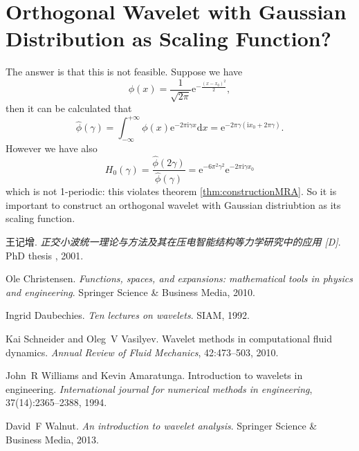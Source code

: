 \documentclass{book}
\newcommand{\mathd}{\mathrm{d}}
\newcommand{\mathe}{\mathrm{e}}
\newcommand{\mathi}{\mathrm{i}}
\newcommand{\mathpi}{\pi}
\newcommand{\tmtextit}[1]{{\itshape{#1}}}
\begin{document}
\section{Orthogonal Wavelet with Gaussian Distribution as Scaling Function?}

The answer is that this is not feasible. Suppose we have
\[ \phi (x) = \frac{1}{\sqrt{2 \mathpi}} \mathe^{- \frac{(x - x_0)^2}{2}}, \]
then it can be calculated that
\[ \hat{\phi} (\gamma) = \int_{- \infty}^{+ \infty} \phi (x) \mathe^{- 2
   \mathpi \mathi \gamma x} \mathd x = \mathe^{- 2 \mathpi \gamma (\mathi x_0
   + 2 \mathpi \gamma)} . \]
However we have also
\[ H_0 (\gamma) = \frac{\hat{\phi} (2 \gamma)}{\hat{\phi} (\gamma)} =
   \mathe^{- 6 \mathpi^2 \gamma^2} \mathe^{- 2 \mathpi \mathi \gamma x_0} \]
which is not 1-periodic: this violates theorem \ref{thm:constructionMRA}. So
it is important to construct an orthogonal wavelet with Gaussian distriubtion
as its scaling function.

\begin{thebibliography}{1}
  王记增.{\newblock}
  \tmtextit{正交小波统一理论与方法及其在压电智能结构等力学研究中的应用
  [D]}.{\newblock} PhD thesis , 2001.{\newblock}
  
  Ole Christensen.{\newblock}
  \tmtextit{Functions, spaces, and expansions: mathematical tools in physics
  and engineering}.{\newblock} Springer Science \& Business Media,
  2010.{\newblock}
  
  Ingrid Daubechies.{\newblock} \tmtextit{Ten
  lectures on wavelets}.{\newblock} SIAM, 1992.{\newblock}
  
  Kai Schneider  and  Oleg~V
  Vasilyev.{\newblock} Wavelet methods in computational fluid
  dynamics.{\newblock} \tmtextit{Annual Review of Fluid Mechanics},
  42:473--503, 2010.{\newblock}
  
  John~R Williams  and  Kevin
  Amaratunga.{\newblock} Introduction to wavelets in engineering.{\newblock}
  \tmtextit{International journal for numerical methods in engineering},
  37(14):2365--2388, 1994.{\newblock}
  
  David~F Walnut.{\newblock} \tmtextit{An
  introduction to wavelet analysis}.{\newblock} Springer Science \& Business
  Media, 2013.{\newblock}
\end{thebibliography}
\end{document}
